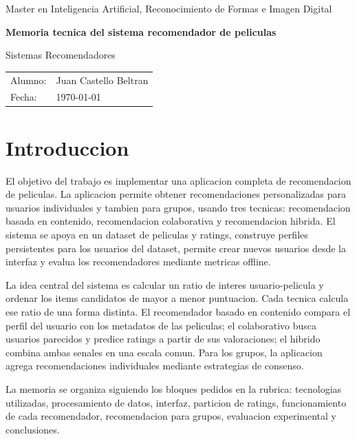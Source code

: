 \documentclass[12pt,a4paper]{article}
\begin{document}

\begin{titlepage}
\centering
{\Large Master en Inteligencia Artificial, Reconocimiento de Formas e Imagen Digital \par}
\vspace{2cm}
{\huge \bfseries Memoria tecnica del sistema recomendador de peliculas\par}
\vspace{0.8cm}
{\Large Sistemas Recomendadores\par}
\vfill
\begin{tabular}{ll}
Alumno: & Juan Castello Beltran \\
Fecha: & \today
\end{tabular}
\vfill
\end{titlepage}

\clearpage
{}
\tableofcontents
\newpage

\section{Introduccion}

El objetivo del trabajo es implementar una aplicacion completa de recomendacion de peliculas. La aplicacion permite obtener recomendaciones personalizadas para usuarios individuales y tambien para grupos, usando tres tecnicas: recomendacion basada en contenido, recomendacion colaborativa y recomendacion hibrida. El sistema se apoya en un dataset de peliculas y ratings, construye perfiles persistentes para los usuarios del dataset, permite crear nuevos usuarios desde la interfaz y evalua los recomendadores mediante metricas offline.

La idea central del sistema es calcular un ratio de interes usuario-pelicula y ordenar los items candidatos de mayor a menor puntuacion. Cada tecnica calcula ese ratio de una forma distinta. El recomendador basado en contenido compara el perfil del usuario con los metadatos de las peliculas; el colaborativo busca usuarios parecidos y predice ratings a partir de sus valoraciones; el hibrido combina ambas senales en una escala comun. Para los grupos, la aplicacion agrega recomendaciones individuales mediante estrategias de consenso.

La memoria se organiza siguiendo los bloques pedidos en la rubrica: tecnologias utilizadas, procesamiento de datos, interfaz, particion de ratings, funcionamiento de cada recomendador, recomendacion para grupos, evaluacion experimental y conclusiones.
\end{document}
